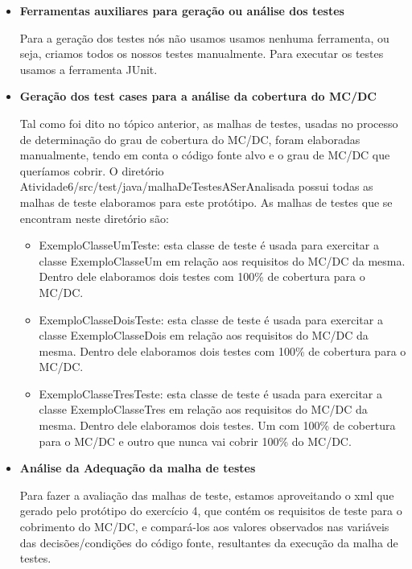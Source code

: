 \documentclass[a4paper,11pt]{article}
\newcommand{\sepitem}{\vspace{0.1in}\item}
\begin{document}
\begin{itemize}

\sepitem \textbf{Ferramentas auxiliares para geração ou análise dos testes}
\setlength{\parindent}{5ex} 

Para a geração dos testes nós não usamos usamos nenhuma ferramenta, ou seja, criamos todos os nossos 
testes manualmente. Para executar os testes usamos a ferramenta JUnit.

\sepitem \textbf{Geração dos test cases para a análise da cobertura do MC/DC}
\setlength{\parindent}{5ex}

Tal como foi dito no tópico anterior, as malhas de testes, usadas no processo de determinação do grau 
de cobertura do MC/DC, foram elaboradas manualmente, tendo em conta o código fonte alvo e o grau de 
MC/DC que queríamos cobrir. O diretório Atividade6/src/test/java/malhaDeTestesASerAnalisada possui 
todas as malhas de teste elaboramos para este protótipo. As malhas de testes que se encontram neste 
diretório são:

\begin{itemize}
\item ExemploClasseUmTeste: esta classe de teste é usada para exercitar a classe ExemploClasseUm 
em relação aos requisitos do MC/DC da mesma. Dentro dele elaboramos dois testes com 100\% de 
cobertura para o MC/DC.
\item ExemploClasseDoisTeste: esta classe de teste é usada para exercitar a classe ExemploClasseDois 
em relação aos requisitos do MC/DC da mesma. Dentro dele elaboramos dois testes com 100\% de 
cobertura para o MC/DC.
\item ExemploClasseTresTeste: esta classe de teste é usada para exercitar a classe ExemploClasseTres 
em relação aos requisitos do MC/DC da mesma. Dentro dele elaboramos dois testes. Um com 100\% de 
cobertura para o MC/DC e outro que nunca vai cobrir 100\% do MC/DC. 
\end{itemize}

\sepitem \textbf{Análise da Adequação da malha de testes}
\setlength{\parindent}{5ex}

Para fazer a avaliação das malhas de teste, estamos aproveitando o xml que gerado pelo protótipo do
exercício 4, que contém os requisitos de teste para o cobrimento do MC/DC, e compará-los aos valores 
observados nas variáveis das decisões/condições do código fonte, resultantes da execução da malha de 
testes.
 

\end{itemize}
\end{document}
